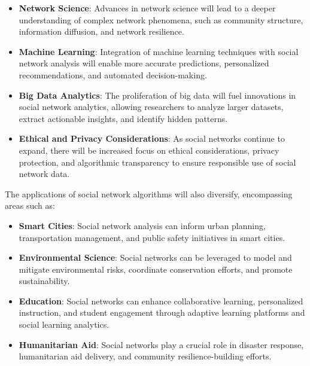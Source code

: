 \documentclass[12pt]{book} %
\begin{document}
\begin{itemize}
    \item \textbf{Network Science}: Advances in network science will lead to a deeper understanding of complex network phenomena, such as community structure, information diffusion, and network resilience.
    
    \item \textbf{Machine Learning}: Integration of machine learning techniques with social network analysis will enable more accurate predictions, personalized recommendations, and automated decision-making.
    
    \item \textbf{Big Data Analytics}: The proliferation of big data will fuel innovations in social network analytics, allowing researchers to analyze larger datasets, extract actionable insights, and identify hidden patterns.
    
    \item \textbf{Ethical and Privacy Considerations}: As social networks continue to expand, there will be increased focus on ethical considerations, privacy protection, and algorithmic transparency to ensure responsible use of social network data.
\end{itemize}

The applications of social network algorithms will also diversify, encompassing areas such as:

\begin{itemize}
    \item \textbf{Smart Cities}: Social network analysis can inform urban planning, transportation management, and public safety initiatives in smart cities.
    
    \item \textbf{Environmental Science}: Social networks can be leveraged to model and mitigate environmental risks, coordinate conservation efforts, and promote sustainability.
    
    \item \textbf{Education}: Social networks can enhance collaborative learning, personalized instruction, and student engagement through adaptive learning platforms and social learning analytics.
    
    \item \textbf{Humanitarian Aid}: Social networks play a crucial role in disaster response, humanitarian aid delivery, and community resilience-building efforts.
\end{itemize}
\end{document}
